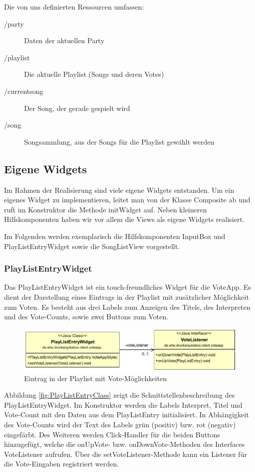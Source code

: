 Die von uns definierten Ressourcen umfassen:
\begin{description}
	\item[/party] Daten der aktuellen Party
	\item[/playlist] Die aktuelle Playlist (Songs und deren Votes)
	\item[/currentsong] Der Song, der gerade gespielt wird
	\item[/song] Songsammlung, aus der Songs für die Playlist gewählt werden
\end{description}

\subsection{Eigene Widgets}
Im Rahmen der Realisierung sind viele eigene Widgets entstanden. Um ein eigenes Widget zu implementieren, leitet man von der Klasse Composite ab und ruft im Konstruktor die Methode initWidget auf. Neben kleineren Hilfskomponenten haben wir vor allem die Views als eigene Widgets realisiert.

Im Folgenden werden exemplarisch die Hilfskomponenten InputBox und PlayListEntryWidget sowie die SongListView vorgestellt.

\subsubsection{PlayListEntryWidget}
Das PlayListEntryWidget ist ein touch-freundliches Widget für die VoteApp. Es dient der Darstellung eines Eintrags in der Playlist mit zusätzlicher Möglichkeit zum Voten. Es besteht aus drei Labels zum Anzeigen des Titels, des Interpreten und des Vote-Counts, sowie zwei Buttons zum Voten. 

\begin{figure}[tbh]
	\centering
	\includegraphics[width=0.7\linewidth]{Bilder/PlayListEntry}
	\caption{Eintrag in der Playlist mit Vote-Möglichkeiten}
	\label{fig:PlayListEntry}
\end{figure}

Abbildung \ref{fig:PlayListEntryClass} zeigt die Schnittstellenbeschreibung des PlayListEntryWidget. Im Konstruktor werden die Labels Interpret, Titel und Vote-Count mit den Daten aus dem PlayListEntry initialisiert. In Abhängigkeit des Vote-Counts wird der Text des Labels grün (positiv) bzw. rot (negativ) eingefärbt. Des Weiteren werden Click-Handler für die beiden Buttons hinzugefügt, welche die onUpVote- bzw. onDownVote-Methoden des Interfaces VoteListener aufrufen. Über die setVoteListener-Methode kann ein Listener für die Vote-Eingaben registriert werden.

